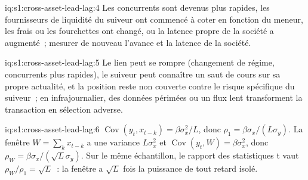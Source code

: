 \begin{solution}{iq:s1:cross-asset-lead-lag:4}
Les concurrents sont devenus plus rapides, les fournisseurs de liquidité du suiveur ont commencé à coter en fonction du meneur, les frais ou les fourchettes ont changé, ou la latence propre de la société a augmenté~;
mesurer de nouveau l'avance et la latence de la société.
\end{solution}

\begin{solution}{iq:s1:cross-asset-lead-lag:5}
Le lien peut se rompre (changement de régime, concurrents plus rapides), le suiveur peut connaître un saut de cours sur sa propre actualité, et la position reste non couverte contre le
risque spécifique du suiveur~; en infrajournalier, des données périmées ou un flux lent transforment la transaction en sélection adverse.
\end{solution}

\begin{solution}{iq:s1:cross-asset-lead-lag:6}
$\operatorname{Cov}(y_t, x_{t-k}) = \beta\sigma_x^2/L$, donc $\rho_1 = \beta\sigma_x/(L\sigma_y)$. La fenêtre $W = \sum_k x_{t-k}$ a une variance $L\sigma_x^2$ et
$\operatorname{Cov}(y_t, W) = \beta\sigma_x^2$, donc $\rho_W = \beta\sigma_x/(\sqrt{L}\sigma_y)$. Sur le même échantillon, le rapport des statistiques t vaut
$\rho_W/\rho_1 = \sqrt{L}$~: la fenêtre a $\sqrt{L}$ fois la puissance de tout retard isolé.
\end{solution}
